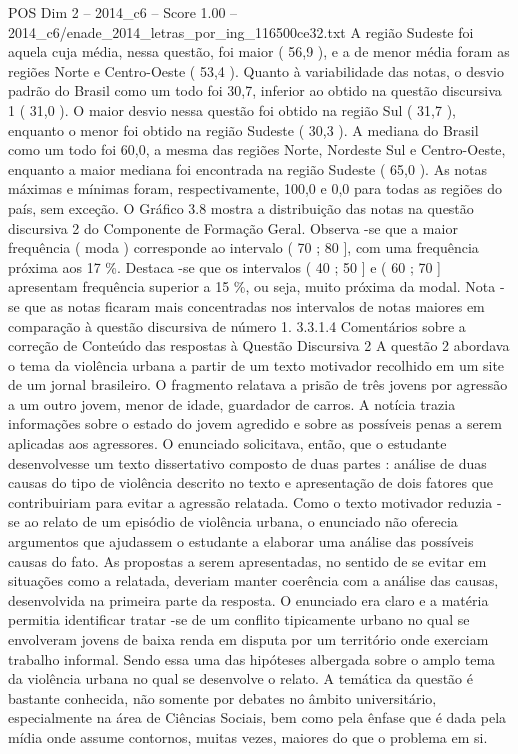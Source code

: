 \begin{textsample}{POS Dim 2 – 2014\_c6 – Score 1.00 – 2014\_c6/enade\_2014\_letras\_por\_ing\_116500ce32.txt}
A região Sudeste foi aquela cuja média, nessa questão, foi maior ( 56,9 ), e a de menor média foram as regiões Norte e Centro-Oeste ( 53,4 ).
Quanto à variabilidade das notas, o desvio padrão do Brasil como um todo foi 30,7, inferior ao obtido na questão discursiva 1 ( 31,0 ).
O maior desvio nessa questão foi obtido na região Sul ( 31,7 ), enquanto o menor foi obtido na região Sudeste ( 30,3 ).
A mediana do Brasil como um todo foi 60,0, a mesma das regiões Norte, Nordeste Sul e Centro-Oeste, enquanto a maior mediana foi encontrada na região Sudeste ( 65,0 ).
As notas máximas e mínimas foram, respectivamente, 100,0 e 0,0 para todas as regiões do país, sem exceção.
O Gráfico 3.8 mostra a distribuição das notas na questão discursiva 2 do Componente de Formação Geral.
Observa -se que a maior frequência ( moda ) corresponde ao intervalo ( 70 ; 80 ], com uma frequência próxima aos 17 \%.
Destaca -se que os intervalos ( 40 ; 50 ] e ( 60 ; 70 ] apresentam frequência superior a 15 \%, ou seja, muito próxima da modal.
Nota -se que as notas ficaram mais concentradas nos intervalos de notas maiores em comparação à questão discursiva de número 1. 3.3.1.4 Comentários sobre a correção de Conteúdo das respostas à Questão Discursiva 2 A questão 2 abordava o tema da violência urbana a partir de um texto motivador recolhido em um site de um jornal brasileiro.
O fragmento relatava a prisão de três jovens por agressão a um outro jovem, menor de idade, guardador de carros.
A notícia trazia informações sobre o estado do jovem agredido e sobre as possíveis penas a serem aplicadas aos agressores.
O enunciado solicitava, então, que o estudante desenvolvesse um texto dissertativo composto de duas partes : análise de duas causas do tipo de violência descrito no texto e apresentação de dois fatores que contribuiriam para evitar a agressão relatada.
Como o texto motivador reduzia -se ao relato de um episódio de violência urbana, o enunciado não oferecia argumentos que ajudassem o estudante a elaborar uma análise das possíveis causas do fato.
As propostas a serem apresentadas, no sentido de se evitar em situações como a relatada, deveriam manter coerência com a análise das causas, desenvolvida na primeira parte da resposta.
O enunciado era claro e a matéria permitia identificar tratar -se de um conflito tipicamente urbano no qual se envolveram jovens de baixa renda em disputa por um território onde exerciam trabalho informal.
Sendo essa uma das hipóteses albergada sobre o amplo tema da violência urbana no qual se desenvolve o relato.
A temática da questão é bastante conhecida, não somente por debates no âmbito universitário, especialmente na área de Ciências Sociais, bem como pela ênfase que é dada pela mídia onde assume contornos, muitas vezes, maiores do que o problema em si.

\end{textsample}
